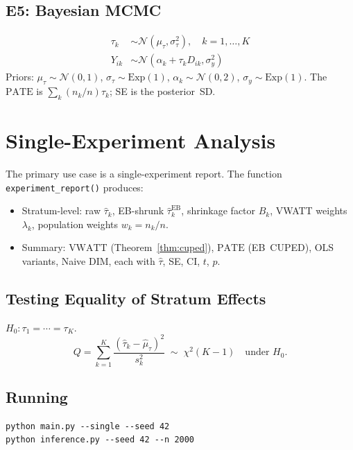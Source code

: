 \documentclass[11pt,letterpaper]{article}
\newcommand{\tauhat}{\hat{\tau}}
\newcommand{\muhat}{\hat{\mu}}
\newcommand{\PATE}{\text{PATE}}
\newcommand{\VWATT}{\text{VWATT}}
\newcommand{\EB}{\text{EB}}
\begin{document}
\subsection{E5: Bayesian MCMC}

\begin{align}
  \tau_k &\sim \mathcal{N}(\mu_\tau, \sigma_\tau^2), \quad k=1,\ldots,K \\
  Y_{ik} &\sim \mathcal{N}(\alpha_k + \tau_k D_{ik}, \sigma_y^2)
\end{align}
Priors: $\mu_\tau \sim \mathcal{N}(0,1)$, $\sigma_\tau \sim \text{Exp}(1)$,
$\alpha_k \sim \mathcal{N}(0,2)$, $\sigma_y \sim \text{Exp}(1)$.
The $\PATE$ is $\sum_k (n_k/n) \tau_k$; SE is the posterior~SD.


\section{Single-Experiment Analysis}\label{sec:single}

The primary use case is a single-experiment report.  The function
\texttt{experiment\_report()} produces:
\begin{itemize}
  \item Stratum-level: raw $\tauhat_k$, EB-shrunk $\tauhat_k^{\EB}$,
    shrinkage factor $B_k$, VWATT weights $\lambda_k$, population
    weights $w_k = n_k/n$.
  \item Summary: $\VWATT$ (Theorem~\ref{thm:cuped}), $\PATE$ (EB~CUPED),
    OLS variants, Naive DIM, each with $\tauhat$, SE, CI, $t$, $p$.
\end{itemize}

\subsection{Testing Equality of Stratum Effects}

$H_0: \tau_1 = \cdots = \tau_K$.
\[
  Q = \sum_{k=1}^{K} \frac{(\tauhat_k - \muhat_\tau)^2}{s_k^2}
  \;\sim\; \chi^2(K-1) \quad \text{under } H_0.
\]

\subsection{Running}
\begin{verbatim}
python main.py --single --seed 42
python inference.py --seed 42 --n 2000
\end{verbatim}
\end{document}
